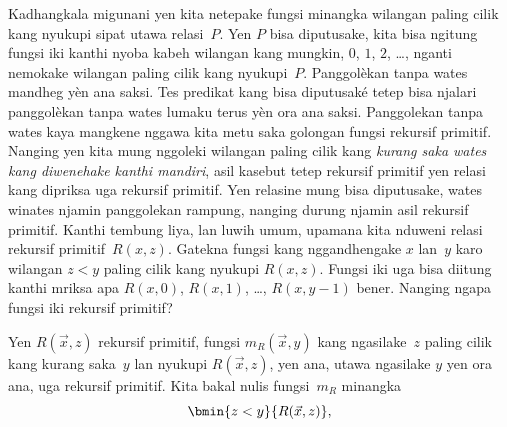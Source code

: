 \documentclass[../../../include/open-logic-section]{subfiles}
\begin{document}

\begin{explain}
Kadhangkala migunani yen kita netepake fungsi minangka wilangan
paling cilik kang nyukupi sipat utawa relasi~$P$. Yen $P$
bisa diputusake, kita bisa ngitung fungsi iki kanthi nyoba
kabeh wilangan kang mungkin, $0$, $1$, $2$, \dots, nganti
nemokake wilangan paling cilik kang nyukupi~$P$. Panggolèkan tanpa wates mandheg yèn ana saksi. Tes predikat kang bisa diputusaké tetep bisa njalari panggolèkan tanpa wates lumaku terus yèn ora ana saksi.
Panggolekan tanpa wates kaya mangkene nggawa kita metu
saka golongan fungsi rekursif primitif. Nanging yen kita
mung nggoleki wilangan paling cilik kang \emph{kurang saka
wates kang diwenehake kanthi mandiri}, asil kasebut tetep
rekursif primitif yen relasi kang dipriksa uga rekursif primitif. Yen relasine mung bisa diputusake, wates winates njamin panggolekan rampung, nanging durung njamin asil rekursif primitif. Kanthi tembung liya, lan luwih umum,
upamana kita nduweni relasi rekursif primitif~$R(x,z)$.
Gatekna fungsi kang nggandhengake $x$ lan~$y$ karo
wilangan $z < y$ paling cilik kang nyukupi $R(x, z)$.
Fungsi iki uga bisa diitung kanthi mriksa apa $R(x, 0)$,
$R(x, 1)$, \dots, $R(x, y-1)$ bener. Nanging ngapa
fungsi iki rekursif primitif?
\end{explain}

\begin{prop}
Yen $R(\vec x, z)$ rekursif primitif, fungsi
$m_R(\vec{x}, y)$ kang ngasilake~$z$ paling cilik
kang kurang saka~$y$ lan nyukupi $R(\vec x, z)$,
yen ana, utawa ngasilake $y$ yen ora ana, uga rekursif
primitif. Kita bakal nulis fungsi~$m_R$ minangka
\[
\bmin{z < y}{R(\vec{x}, z)},
\]
\end{prop}
\end{document}
